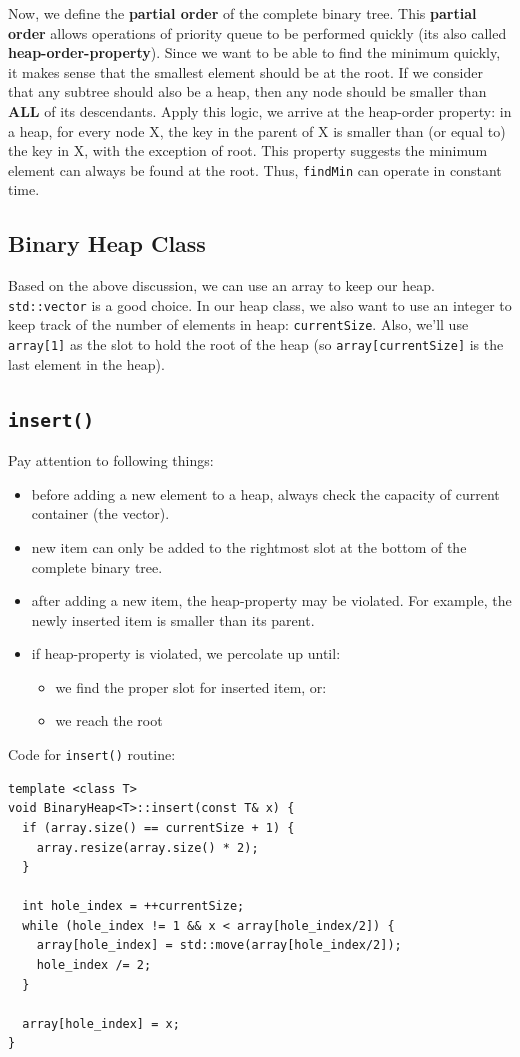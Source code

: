 \documentclass[11pt]{book}
\begin{document}
Now, we define the \textbf{partial order} of the complete binary tree. This \textbf{partial order} allows operations of priority queue to be performed quickly (its also called \textbf{heap-order-property}). Since we want to be able to find the minimum quickly, it makes sense that the smallest element should be at the root. If we consider that any subtree should also be a heap, then any node should be smaller than \textbf{ALL} of its descendants. Apply this logic, we arrive at the heap-order property: in a heap, for every node X, the key in the parent of X is smaller than (or equal to) the key in X, with the exception of root. This property suggests the minimum element can always be found at the root. Thus, \texttt{findMin} can operate in constant time.
\subsection{Binary Heap Class}
\label{sec:orgeba8baa}

Based on the above discussion, we can use an array to keep our heap. \texttt{std::vector} is a good choice. In our heap class, we also want to use an integer to keep track of the number of elements in heap: \texttt{currentSize}. Also, we'll use \texttt{array[1]} as the slot to hold the root of the heap (so \texttt{array[currentSize]} is the last element in the heap).
\subsection{\texttt{insert()}}
\label{sec:orgfd4d477}

Pay attention to following things:
\begin{itemize}
\item before adding a new element to a heap, always check the capacity of current container (the vector).
\item new item can only be added to the rightmost slot at the bottom of the complete binary tree.
\item after adding a new item, the heap-property may be violated. For example, the newly inserted item is smaller than its parent.
\item if heap-property is violated, we percolate up until:
\begin{itemize}
\item we find the proper slot for inserted item, or:
\item we reach the root
\end{itemize}
\end{itemize}
Code for \texttt{insert()} routine:
\begin{verbatim}
template <class T>
void BinaryHeap<T>::insert(const T& x) {
  if (array.size() == currentSize + 1) {
    array.resize(array.size() * 2);
  }

  int hole_index = ++currentSize;
  while (hole_index != 1 && x < array[hole_index/2]) {
    array[hole_index] = std::move(array[hole_index/2]);
    hole_index /= 2;
  }

  array[hole_index] = x;
}
\end{verbatim}
\end{document}
